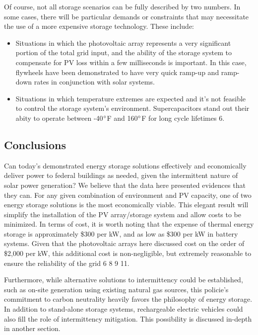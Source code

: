Of course, not all storage scenarios can be fully described by two numbers. In
some cases, there will be particular demands or constraints that may
necessitate the use of a more expensive storage technology. These include:
\begin{itemize}
\item Situations in which the photovoltaic array represents a very significant
portion of the total grid input, and the ability of the storage system to
compensate for PV loss within a few milliseconds is important. In this case,
flywheels have been demonstrated to have very quick ramp-up and ramp-down rates
in conjunction with solar systems.
\item Situations in which temperature extremes are expected and it’s not
feasible to control the storage system’s environment. Supercapacitors stand out their abity
to operate between -40$\degree$F and 160$\degree$F for long cycle lifetimes \cite{patrick}{6}.
\end{itemize}

\subsection{Conclusions}

Can today’s demonstrated energy storage solutions effectively and economically
deliver power to federal buildings as needed, given the intermittent nature of
solar power generation? We believe that the data here presented evidences that
they can. For any given combination of environment and PV capacity, one of two
energy storage solutions is the most economically viable. This elegant result will
simplify the installation of the PV array/storage system and allow costs to be
minimized. In terms of cost, it is worth noting that the expense of thermal energy
storage is approximately \$300 per kW, and as low as \$300 per kW in battery
systems. Given that the photovoltaic arrays here discussed cost on the order of
\$2,000 per kW, this additional cost is non-negligible, but extremely reasonable
to ensure the reliability of the grid \cite{patrick}{6} \cite{patrick}{8} \cite{patrick}{9} \cite{patrick}{11}.

Furthermore, while alternative solutions to intermittency could be established,
such as on-site generation using existing natural gas sources, this policie's
commitment to carbon neutrality heavily favors the philosophy of energy
storage. In addition to stand-alone storage systems, rechargeable electric
vehicles could also fill the role of intermittency mitigation. This possibility
is discussed in-depth in another section.
